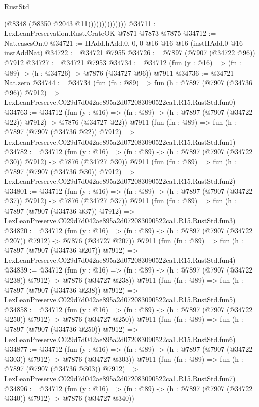 \begin{lexlean}{RustStd}
\begin{coremodule}
                            (@8348 (@8350 @2043 @11))))))))))))))
@34711 := LexLeanPreservation.Rust.CrateOK @7871 @7873 @7875
@34712 := Nat.casesOn.{0}
@34721 := HAdd.hAdd.{0, 0, 0} @16 @16 @16 (instHAdd.{0} @16 instAddNat)
@34722 := @34721 @7955
@34726 := @7897 (@7907 (@34722 @96)) @7912
@34727 := @34721 @7953
@34734 := @34712 (fun (y : @16) => (fn : @89) -> (h : @34726) -> @7876 (@34727 @96)) @7911
@34736 := @34721 Nat.zero
@34744 := @34734
    (fun (fn : @89) =>
    fun (h : @7897 (@7907 (@34736 @96)) @7912) =>
    LexLeanPreserve.C029d7d042ae895a2d072083090522ca1.R15.RustStd.fun0)
@34763 := @34712
    (fun (y : @16) => (fn : @89) -> (h : @7897 (@7907 (@34722 @22)) @7912) -> @7876 (@34727 @22))
    @7911
    (fun (fn : @89) =>
    fun (h : @7897 (@7907 (@34736 @22)) @7912) =>
    LexLeanPreserve.C029d7d042ae895a2d072083090522ca1.R15.RustStd.fun1)
@34782 := @34712
    (fun (y : @16) => (fn : @89) -> (h : @7897 (@7907 (@34722 @30)) @7912) -> @7876 (@34727 @30))
    @7911
    (fun (fn : @89) =>
    fun (h : @7897 (@7907 (@34736 @30)) @7912) =>
    LexLeanPreserve.C029d7d042ae895a2d072083090522ca1.R15.RustStd.fun2)
@34801 := @34712
    (fun (y : @16) => (fn : @89) -> (h : @7897 (@7907 (@34722 @37)) @7912) -> @7876 (@34727 @37))
    @7911
    (fun (fn : @89) =>
    fun (h : @7897 (@7907 (@34736 @37)) @7912) =>
    LexLeanPreserve.C029d7d042ae895a2d072083090522ca1.R15.RustStd.fun3)
@34820 := @34712
    (fun (y : @16) => (fn : @89) -> (h : @7897 (@7907 (@34722 @207)) @7912) -> @7876 (@34727 @207))
    @7911
    (fun (fn : @89) =>
    fun (h : @7897 (@7907 (@34736 @207)) @7912) =>
    LexLeanPreserve.C029d7d042ae895a2d072083090522ca1.R15.RustStd.fun4)
@34839 := @34712
    (fun (y : @16) => (fn : @89) -> (h : @7897 (@7907 (@34722 @238)) @7912) -> @7876 (@34727 @238))
    @7911
    (fun (fn : @89) =>
    fun (h : @7897 (@7907 (@34736 @238)) @7912) =>
    LexLeanPreserve.C029d7d042ae895a2d072083090522ca1.R15.RustStd.fun5)
@34858 := @34712
    (fun (y : @16) => (fn : @89) -> (h : @7897 (@7907 (@34722 @250)) @7912) -> @7876 (@34727 @250))
    @7911
    (fun (fn : @89) =>
    fun (h : @7897 (@7907 (@34736 @250)) @7912) =>
    LexLeanPreserve.C029d7d042ae895a2d072083090522ca1.R15.RustStd.fun6)
@34877 := @34712
    (fun (y : @16) => (fn : @89) -> (h : @7897 (@7907 (@34722 @303)) @7912) -> @7876 (@34727 @303))
    @7911
    (fun (fn : @89) =>
    fun (h : @7897 (@7907 (@34736 @303)) @7912) =>
    LexLeanPreserve.C029d7d042ae895a2d072083090522ca1.R15.RustStd.fun7)
@34896 := @34712
    (fun (y : @16) => (fn : @89) -> (h : @7897 (@7907 (@34722 @340)) @7912) -> @7876 (@34727 @340))

\end{coremodule}
\end{lexlean}
